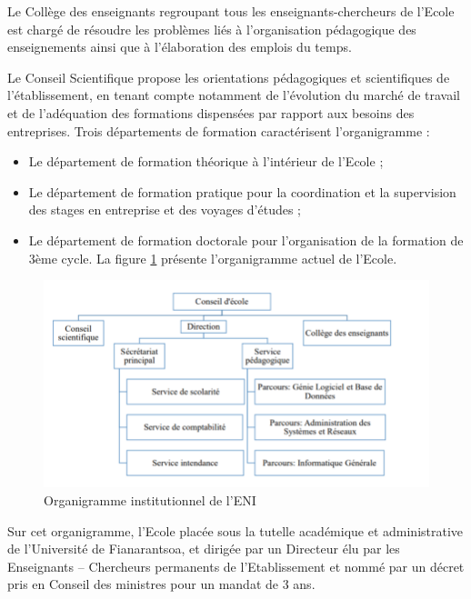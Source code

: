 \documentclass[12pt]{report}
\begin{document}
				Le Collège des enseignants regroupant tous les enseignants-chercheurs de l’Ecole est chargé de résoudre les problèmes liés à l’organisation pédagogique des enseignements ainsi que à l’élaboration des emplois du temps.

				\begin{center}
					\begin{minipage}{\textwidth}
						\hspace{15pt} Le Conseil Scientifique propose les orientations pédagogiques et scientifiques de l’établissement, en tenant compte notamment de l’évolution du marché de travail et de l’adéquation des formations dispensées par rapport aux besoins des entreprises. Trois départements de formation caractérisent l’organigramme :
						\begin{itemize}
							\item Le département de formation théorique à l’intérieur de l’Ecole ;
							\item Le département de formation pratique pour la coordination et la supervision des stages en entreprise et des voyages d’études ;
							\item Le département de formation doctorale pour l’organisation de la formation de 3ème cycle. La figure \ref{fig:figure 1} présente l’organigramme actuel de l’Ecole.
						\end{itemize}
					\end{minipage}
				\end{center}
				\begin{figure}[h]
					\centering
					\includegraphics[width=\textwidth]{image4.png}
					\caption{Organigramme institutionnel de l'ENI}
					\label{fig:figure 1}
				\end{figure}
				\clearpage
				
				Sur cet organigramme, l’Ecole placée sous la tutelle académique et administrative de l’Université de Fianarantsoa, et dirigée par un Directeur élu par les Enseignants – Chercheurs permanents de l’Etablissement et nommé par un décret pris en Conseil des ministres pour un mandat de 3 ans. 
\end{document}
